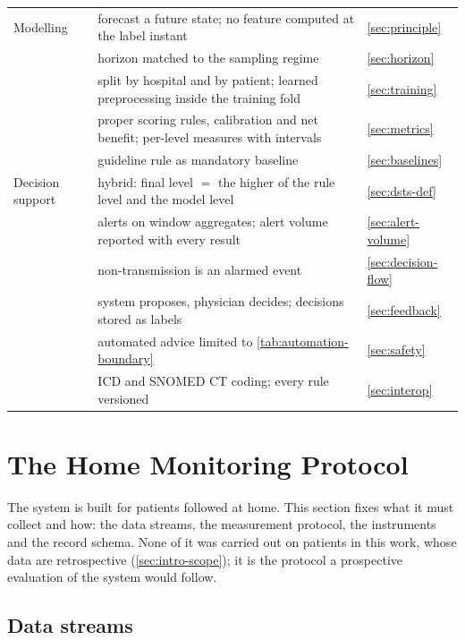 \begin{table}[htbp]
\begin{tabularx}{\textwidth}{@{}>{\raggedright\arraybackslash}p{2.2cm} X >{\raggedright\arraybackslash}p{3.5cm}@{}}
\addlinespace
Modelling & forecast a future state; no feature computed at the label instant & \cref{sec:principle} \\
 & horizon matched to the sampling regime & \cref{sec:horizon} \\
 & split by hospital and by patient; learned preprocessing inside the training fold & \cref{sec:training} \\
 & proper scoring rules, calibration and net benefit; per-level measures with intervals & \cref{sec:metrics} \\
 & guideline rule as mandatory baseline & \cref{sec:baselines} \\
\addlinespace
Decision support & hybrid: final level $=$ the higher of the rule level and the model level & \cref{sec:dsts-def} \\
 & alerts on window aggregates; alert volume reported with every result & \cref{sec:alert-volume} \\
 & non-transmission is an alarmed event & \cref{sec:decision-flow} \\
 & system proposes, physician decides; decisions stored as labels & \cref{sec:feedback} \\
 & automated advice limited to \cref{tab:automation-boundary} & \cref{sec:safety} \\
 & ICD and SNOMED CT coding; every rule versioned & \cref{sec:interop} \\
\bottomrule
\end{tabularx}
\end{table}

\section{The Home Monitoring Protocol}\label{sec:home-protocol}

The system is built for patients followed at home. This section fixes what it must collect and how: the data streams, the measurement protocol, the instruments and the record schema. None of it was carried out on patients in this work, whose data are retrospective (\cref{sec:intro-scope}); it is the protocol a prospective evaluation of the system would follow.

\subsection{Data streams}\label{sec:pipelines}\label{sec:streams}

